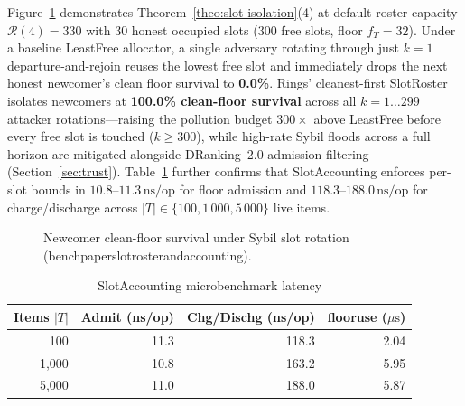 \documentclass[journal]{IEEEtran}
\DeclareRobustCommand{\code}[1]{{\ttfamily\renewcommand{\_}{\textunderscore\allowbreak}#1}}
\begin{document}
Figure~\ref{fig:slot-roster} demonstrates Theorem~\ref{theo:slot-isolation}(4) at default roster capacity $\mathcal{R}(4)=330$ with $30$ honest occupied slots ($300$ free slots, floor $f_T=32$). Under a baseline \code{LeastFree} allocator, a single adversary rotating through just $k=1$ departure-and-rejoin reuses the lowest free slot and immediately drops the next honest newcomer's clean floor survival to \textbf{0.0\%}. Rings' cleanest-first \code{SlotRoster} isolates newcomers at \textbf{100.0\% clean-floor survival} across all $k=1\dots 299$ attacker rotations---raising the pollution budget $300\times$ above \code{LeastFree} before every free slot is touched ($k\ge 300$), while high-rate Sybil floods across a full horizon are mitigated alongside DRanking~2.0 admission filtering (Section~\ref{sec:trust}). Table~\ref{tab:slot-latency} further confirms that \code{SlotAccounting} enforces per-slot bounds in $10.8$--$11.3\,\text{ns/op}$ for floor admission and $118.3$--$188.0\,\text{ns/op}$ for charge/discharge across $|T|\in\{100,1\,000,5\,000\}$ live items.

\begin{figure}[t]
\centering
{}
\caption{Newcomer clean-floor survival under Sybil slot rotation (\code{bench\_paper\_slot\_roster\_and\_accounting}).}
\label{fig:slot-roster}
\end{figure}

\begin{table}[t]
\centering
\caption{\code{SlotAccounting} microbenchmark latency}
\label{tab:slot-latency}
\scriptsize
\setlength{\tabcolsep}{3pt}
\begin{tabular}{@{}rrrr@{}}
\toprule
Items $|T|$ & Admit (ns/op) & Chg/Dischg (ns/op) & \code{floor\_use} ($\mu\text{s}$) \\
\midrule
100   & 11.3 & 118.3 & 2.04 \\
1,000 & 10.8 & 163.2 & 5.95 \\
5,000 & 11.0 & 188.0 & 5.87 \\
\bottomrule
\end{tabular}
\end{table}
\end{document}
